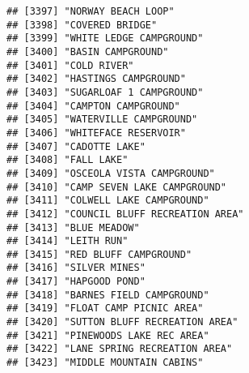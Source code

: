 \documentclass[
]{article}
\begin{document}
\begin{verbatim}
## [3397] "NORWAY BEACH LOOP"                                                                   
## [3398] "COVERED BRIDGE"                                                                      
## [3399] "WHITE LEDGE CAMPGROUND"                                                              
## [3400] "BASIN CAMPGROUND"                                                                    
## [3401] "COLD RIVER"                                                                          
## [3402] "HASTINGS CAMPGROUND"                                                                 
## [3403] "SUGARLOAF 1 CAMPGROUND"                                                              
## [3404] "CAMPTON CAMPGROUND"                                                                  
## [3405] "WATERVILLE CAMPGROUND"                                                               
## [3406] "WHITEFACE RESERVOIR"                                                                 
## [3407] "CADOTTE LAKE"                                                                        
## [3408] "FALL LAKE"                                                                           
## [3409] "OSCEOLA VISTA CAMPGROUND"                                                            
## [3410] "CAMP SEVEN LAKE CAMPGROUND"                                                          
## [3411] "COLWELL LAKE CAMPGROUND"                                                             
## [3412] "COUNCIL BLUFF RECREATION AREA"                                                       
## [3413] "BLUE MEADOW"                                                                         
## [3414] "LEITH RUN"                                                                           
## [3415] "RED BLUFF CAMPGROUND"                                                                
## [3416] "SILVER MINES"                                                                        
## [3417] "HAPGOOD POND"                                                                        
## [3418] "BARNES FIELD CAMPGROUND"                                                             
## [3419] "FLOAT CAMP PICNIC AREA"                                                              
## [3420] "SUTTON BLUFF RECREATION AREA"                                                        
## [3421] "PINEWOODS LAKE REC AREA"                                                             
## [3422] "LANE SPRING RECREATION AREA"                                                         
## [3423] "MIDDLE MOUNTAIN CABINS"                                                              

\end{verbatim}
\end{document}
